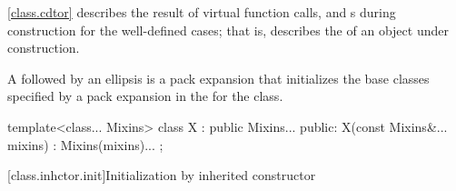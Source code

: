 \pnum
\begin{note}
\ref{class.cdtor} describes the result of virtual function calls,
and
s
during construction for the well-defined cases;
that is, describes the
of an object under construction.
\end{note}

\pnum
{}%
A  followed by an ellipsis is
a pack expansion that initializes the base
classes specified by a pack expansion in the 
for the class.
\begin{example}
\begin{codeblock}
template<class... Mixins>
class X : public Mixins... {
public:
  X(const Mixins&... mixins) : Mixins(mixins)... { }
};
\end{codeblock}

\end{example}

[class.inhctor.init]{Initialization by inherited constructor}%

